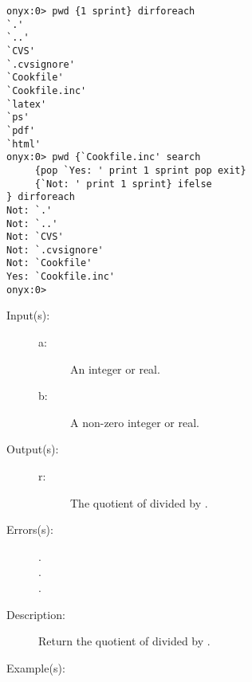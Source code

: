 \begin{description}
\begin{description}
\begin{verbatim}
onyx:0> pwd {1 sprint} dirforeach
`.'
`..'
`CVS'
`.cvsignore'
`Cookfile'
`Cookfile.inc'
`latex'
`ps'
`pdf'
`html'
onyx:0> pwd {`Cookfile.inc' search
     {pop `Yes: ' print 1 sprint pop exit}
     {`Not: ' print 1 sprint} ifelse
} dirforeach
Not: `.'
Not: `..'
Not: `CVS'
Not: `.cvsignore'
Not: `Cookfile'
Yes: `Cookfile.inc'
onyx:0>
		\end{verbatim}
	\end{description}
\label{systemdict:div}
\item[{\onyxop{a b}{div}{r}}: ]
	\begin{description}\item[]
	\item[Input(s): ]
		\begin{description}\item[]
		\item[a: ]
			An integer or real.
		\item[b: ]
			A non-zero integer or real.
		\end{description}
	\item[Output(s): ]
		\begin{description}\item[]
		\item[r: ]
			The quotient of  divided by .
		\end{description}
	\item[Errors(s): ]
		\begin{description}\item[]
		\item[.]
		\item[.]
		\item[.]
		\end{description}
	\item[Description: ]
		Return the quotient of  divided by .
	\item[Example(s): ]\begin{verbatim}


\end{verbatim}
\end{description}
\end{description}
